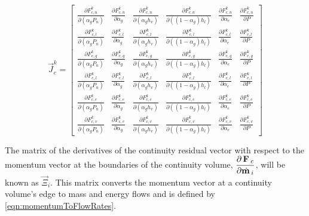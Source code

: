 \begin{equation}
\label{eqn:jacobianWithFluxTerms}
\vec{J}^{k}_{c} = 
\begin{bmatrix}
\frac{\partial F^{k}_{c,n}}{\partial (\alpha_g P_{n})} & \frac{\partial F^{k}_{c,n}}{\partial \alpha_g } & \frac{\partial F^{k}_{c,n}}{\partial (\alpha_g h_v)} & \frac{\partial F^{k}_{c,n}}{\partial ((1 - \alpha_g) h_l) } & \frac{\partial F^{k}_{c,n}}{\partial \alpha_e } & \frac{\partial F^{k}_{c,n}}{\partial P } \\
\frac{\partial F^{k}_{c,l}}{\partial (\alpha_g P_{n})} & \frac{\partial F^{k}_{c,l}}{\partial \alpha_g } & \frac{\partial F^{k}_{c,l}}{\partial (\alpha_g h_v)} & \frac{\partial F^{k}_{c,l}}{\partial ((1 - \alpha_g) h_l)} &\frac{\partial F^{k}_{c,l}}{\partial \alpha_e } & \frac{\partial F^{k}_{c,l}}{\partial P } \\
\frac{\partial F^{k}_{e,g}}{\partial (\alpha_g P_{n})} & \frac{\partial F^{k}_{e,g}}{\partial \alpha_g } & \frac{\partial F^{k}_{e,g}}{\partial (\alpha_g h_v)} & \frac{\partial F^{k}_{e,g}}{\partial ((1 - \alpha_g) h_l)} &\frac{\partial F^{k}_{e,g}}{\partial \alpha_e } & \frac{\partial F^{k}_{e,g}}{\partial P } \\
\frac{\partial F^{k}_{e,l}}{\partial (\alpha_g P_{n})} & \frac{\partial F^{k}_{e,l}}{\partial \alpha_g } & \frac{\partial F^{k}_{e,l}}{\partial (\alpha_g h_v)} & \frac{\partial F^{k}_{e,l}}{\partial ((1 - \alpha_g) h_l)} &\frac{\partial F^{k}_{e,l}}{\partial \alpha_e } & \frac{\partial F^{k}_{e,l}}{\partial P } \\
\frac{\partial F^{k}_{c,e}}{\partial (\alpha_g P_{n})} & \frac{\partial F^{k}_{c,e}}{\partial \alpha_g } & \frac{\partial F^{k}_{c,e}}{\partial (\alpha_g h_v)} & \frac{\partial F^{k}_{c,e}}{\partial ((1 - \alpha_g) h_l)} &\frac{\partial F^{k}_{c,e}}{\partial \alpha_e } & \frac{\partial F^{k}_{c,e}}{\partial P } \\
\frac{\partial F^{k}_{c,v}}{\partial (\alpha_g P_{n})} & \frac{\partial F^{k}_{c,v}}{\partial \alpha_g } & \frac{\partial F^{k}_{c,v}}{\partial (\alpha_g h_v)} & \frac{\partial F^{k}_{c,v}}{\partial ((1 - \alpha_g) h_l)} & \frac{\partial F^{k}_{c,v}}{\partial \alpha_e } & \frac{\partial F^{k}_{c,v}}{\partial P }
\end{bmatrix}
\end{equation}

The matrix of the derivatives of the continuity residual vector with respect to the momentum vector at the boundaries of the continuity volume, $\displaystyle \frac{\partial\,\vec{F}_{c}}{\partial \momVec{}_{i}}$, will be known as $\vec{\Xi}_{i}$.
This matrix converts the momentum vector at a continuity volume's edge to mass and energy flows and is defined by \eqref{eqn:momentumToFlowRates}.


